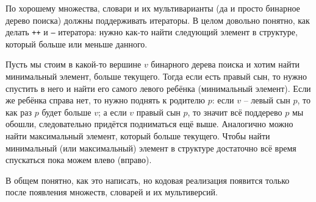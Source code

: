 По хорошему множества, словари и их мультиварианты (да и просто бинарное дерево поиска) должны поддерживать итераторы. В целом довольно понятно, как делать \texttt{++} и \texttt{--} итератора: нужно как-то найти следующий элемент в структуре, который больше или меньше данного.

Пусть мы стоим в какой-то вершине $v$ бинарного дерева поиска и хотим найти минимальный элемент, больше текущего. Тогда если есть правый сын, то нужно спустить в него и найти его самого левого ребёнка (минимальный элемент). Если же ребёнка справа нет, то нужно поднять к родителю $p$: если $v$ -- левый сын $p$, то как раз $p$ будет больше $v$; а если $v$ правый сын $p$, то значит всё поддерево $p$ мы обошли, следовательно придётся подниматься ещё выше. Аналогично можно найти максимальный элемент, который больше текущего. Чтобы найти минимальный (или максимальный) элемент в структуре достаточно всё время спускаться пока можем влево (вправо).

В общем понятно, как это написать, но кодовая реализация появится только после появления множеств, словарей и их мультиверсий.
